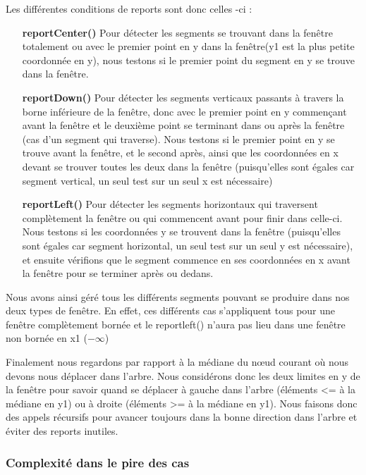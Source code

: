 \documentclass[10pt,a4paper]{article}
\begin{document}
Les différentes conditions de reports sont donc celles -ci :\begin{itemize}
\item[\textbf{reportCenter()}] Pour détecter les segments se trouvant dans la fenêtre totalement ou avec le premier point en y dans la fenêtre(y1 est la plus petite coordonnée en y), nous testons si le premier point du segment en y se trouve dans la fenêtre.

\item[\textbf{reportDown()}] Pour détecter les segments verticaux passants à travers la borne inférieure de la fenêtre, donc avec le premier point en y commençant avant la fenêtre et le deuxième point se terminant dans ou après la fenêtre (cas d'un segment qui traverse). Nous testons si le premier point en y se trouve avant la fenêtre, et le second après, ainsi que les coordonnées en x devant se trouver toutes les deux dans la fenêtre (puisqu'elles sont égales car segment vertical, un seul test sur un seul x est nécessaire)

\item[\textbf{reportLeft()}] Pour détecter les segments horizontaux qui traversent complètement la fenêtre ou qui commencent avant pour finir dans celle-ci. Nous testons si les coordonnées y se trouvent dans la fenêtre (puisqu'elles sont égales car segment horizontal, un seul test sur un seul y est nécessaire), et ensuite vérifions que le segment commence en ses coordonnées en x avant la fenêtre pour se terminer après ou dedans.

\end{itemize}
Nous avons ainsi géré tous les différents segments pouvant se produire dans nos deux types de fenêtre. En effet, ces différents cas s'appliquent tous pour une fenêtre complètement bornée et le reportleft() n'aura pas lieu dans une fenêtre non bornée en x1 ($-\infty$)

Finalement nous regardons par rapport à la médiane du nœud courant où nous devons nous déplacer dans l'arbre. Nous considérons donc les deux limites en y de la fenêtre pour savoir quand se déplacer à gauche dans l'arbre (éléments <= à la médiane en y1) ou à droite (éléments >= à la médiane en y1). Nous faisons donc des appels récursifs pour avancer toujours dans la bonne direction dans l'arbre et éviter des reports inutiles.

\subsubsection{Complexité dans le pire des cas}
\end{document}
